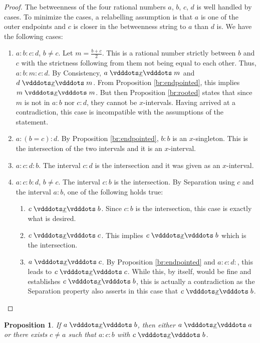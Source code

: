 \documentclass[12pt]{article}
\newtheorem{proposition}{Proposition}[section]
\begin{document}
\begin{proof}
    The betweenness of the four rational numbers $a$, $b$, $c$, $d$ is well handled by cases. To minimize the cases, a relabelling assumption is that $a$ is one of the outer endpoints and $c$ is closer in the betweenness string to $a$ than $d$ is. We have the following cases: 

    \begin{enumerate}
        \item $a:b:c:d$, $b \neq c$. Let $m = \frac{b+c}{2}$. This is a rational number strictly between $b$ and $c$ with the strictness following from them not being equal to each other. Thus, $a:b:m:c:d$. By Consistency, $a\xrel m$ and $d \xrel m$. From Proposition \ref{br:endpointed}, this implies $m \xrel m$. But then Proposition \ref{br:rooted} states that since $m$ is not in $a:b$ nor $c:d$, they cannot be $x$-intervals. Having arrived at a contradiction, this case is incompatible with the assumptions of the statement. 
        \item $a:(b=c):d$. By Proposition \ref{br:endpointed}, $b:b$ is an $x$-singleton. This is the intersection of the two intervals and it is an $x$-interval. 
        \item $a:c:d:b$. The interval $c:d$ is the intersection and it was given as an $x$-interval. 
        \item $a:c:b:d$, $b \neq c$. The interval $c:b$ is the intersection. By Separation using $c$ and the interval $a:b$, one of the following holds true: 
        \begin{enumerate}
            \item $c \xrel b$. Since $c:b$ is the intersection, this case is exactly what is desired.
            \item $c \xrel c$. This implies $c \xrel b$ which is the intersection. 
            \item $a \xrel c$. By Proposition \ref{br:endpointed} and $a : c: d:$, this leads to $c \xrel c$. While this, by itself, would be fine and establishes $c \xrel b$, this is actually a contradiction as the Separation property also asserts in this case that \sout{$c \xrel b$}.
        \end{enumerate}
    \end{enumerate}
\end{proof}


\begin{proposition}\label{br:something-inside}
    If $a \xrel b$, then either $a \xrel a$ or there exists $c \neq a$ such that $a : c : b$ with $c \xrel b$. 
\end{proposition}
\end{document}
